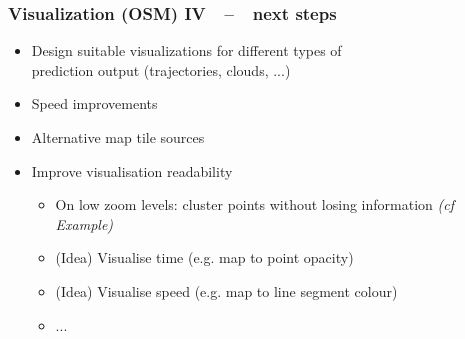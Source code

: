 \documentclass[xcolor=dvipsnames]{beamer}
\begin{document}
\begin{frame}
	\frametitle{\textbf{Visualization (OSM) IV}~~--~~next steps}
	\begin{itemize} 
		\item Design suitable visualizations for different types of\\ prediction output (trajectories, clouds, ...)
		\item Speed improvements
		\item Alternative map tile sources
		\item Improve visualisation readability
		\begin{itemize}
			\item On low zoom levels: cluster points without losing information \textit{(cf Example)}
			\item (Idea) Visualise time (e.g. map to point opacity)
			\item (Idea) Visualise speed (e.g. map to line segment colour)
			\item ...
		\end{itemize}		
	\end{itemize} 
\end{frame}
\end{document}

